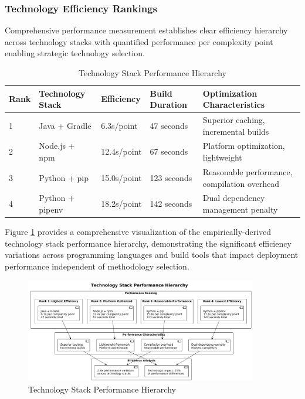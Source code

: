 \subsubsection{Technology Efficiency Rankings}

Comprehensive performance measurement establishes clear efficiency hierarchy across technology stacks with quantified performance per complexity point enabling strategic technology selection.

\begin{table}[H]
\centering
\caption{Technology Stack Performance Hierarchy}
\label{tab:technology_hierarchy}
\begin{tabular}{|p{1cm}|p{3cm}|p{2.5cm}|p{3cm}|p{4cm}|}
\hline
\textbf{Rank} & \textbf{Technology Stack} & \textbf{Efficiency} & \textbf{Build Duration} & \textbf{Optimization Characteristics} \\
\hline
1 & Java + Gradle & 6.3s/point & 47 seconds & Superior caching, incremental builds \\
\hline
2 & Node.js + npm & 12.4s/point & 67 seconds & Platform optimization, lightweight \\
\hline
3 & Python + pip & 15.0s/point & 123 seconds & Reasonable performance, compilation overhead \\
\hline
4 & Python + pipenv & 18.2s/point & 142 seconds & Dual dependency management penalty \\
\hline
\end{tabular}
\end{table}

Figure \ref{fig:technology-stack-hierarchy} provides a comprehensive visualization of the empirically-derived technology stack performance hierarchy, demonstrating the significant efficiency variations across programming languages and build tools that impact deployment performance independent of methodology selection.

\begin{figure}[H]
\centering
\includegraphics[width=0.9\textwidth]{figures/Technology-Stack-Performance-Hierarchy.png}
\caption{Technology Stack Performance Hierarchy}
\label{fig:technology-stack-hierarchy}
\end{figure}

